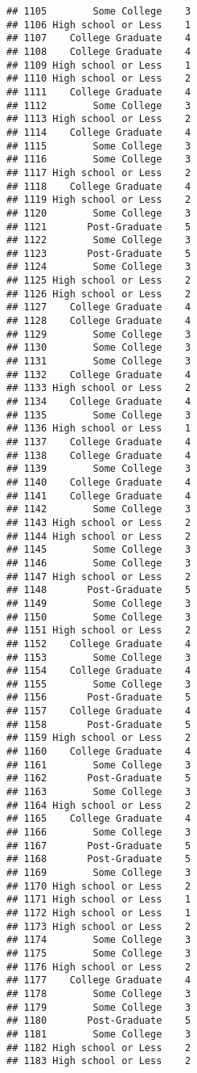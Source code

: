 \documentclass[
]{article}
\begin{document}
\begin{verbatim}
## 1105        Some College    3
## 1106 High school or Less    1
## 1107    College Graduate    4
## 1108    College Graduate    4
## 1109 High school or Less    1
## 1110 High school or Less    2
## 1111    College Graduate    4
## 1112        Some College    3
## 1113 High school or Less    2
## 1114    College Graduate    4
## 1115        Some College    3
## 1116        Some College    3
## 1117 High school or Less    2
## 1118    College Graduate    4
## 1119 High school or Less    2
## 1120        Some College    3
## 1121       Post-Graduate    5
## 1122        Some College    3
## 1123       Post-Graduate    5
## 1124        Some College    3
## 1125 High school or Less    2
## 1126 High school or Less    2
## 1127    College Graduate    4
## 1128    College Graduate    4
## 1129        Some College    3
## 1130        Some College    3
## 1131        Some College    3
## 1132    College Graduate    4
## 1133 High school or Less    2
## 1134    College Graduate    4
## 1135        Some College    3
## 1136 High school or Less    1
## 1137    College Graduate    4
## 1138    College Graduate    4
## 1139        Some College    3
## 1140    College Graduate    4
## 1141    College Graduate    4
## 1142        Some College    3
## 1143 High school or Less    2
## 1144 High school or Less    2
## 1145        Some College    3
## 1146        Some College    3
## 1147 High school or Less    2
## 1148       Post-Graduate    5
## 1149        Some College    3
## 1150        Some College    3
## 1151 High school or Less    2
## 1152    College Graduate    4
## 1153        Some College    3
## 1154    College Graduate    4
## 1155        Some College    3
## 1156       Post-Graduate    5
## 1157    College Graduate    4
## 1158       Post-Graduate    5
## 1159 High school or Less    2
## 1160    College Graduate    4
## 1161        Some College    3
## 1162       Post-Graduate    5
## 1163        Some College    3
## 1164 High school or Less    2
## 1165    College Graduate    4
## 1166        Some College    3
## 1167       Post-Graduate    5
## 1168       Post-Graduate    5
## 1169        Some College    3
## 1170 High school or Less    2
## 1171 High school or Less    1
## 1172 High school or Less    1
## 1173 High school or Less    2
## 1174        Some College    3
## 1175        Some College    3
## 1176 High school or Less    2
## 1177    College Graduate    4
## 1178        Some College    3
## 1179        Some College    3
## 1180       Post-Graduate    5
## 1181        Some College    3
## 1182 High school or Less    2
## 1183 High school or Less    2

\end{verbatim}
\end{document}

